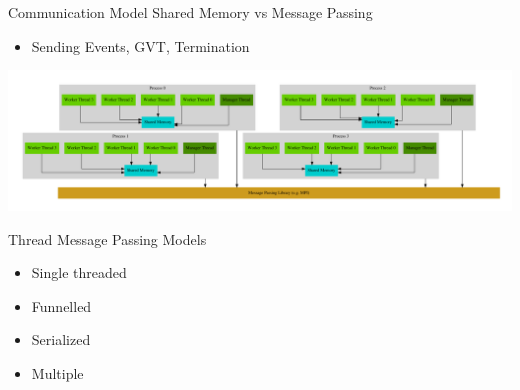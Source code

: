 \documentclass[10pt]{beamer}
\begin{document}
\begin{frame}{Communication Model}
    Shared Memory vs Message Passing
    \begin{itemize}
        \item Sending Events, GVT, Termination
    \end{itemize}
    \centerline{\includegraphics[width=1.2\textwidth]{../figs/graphviz/warped_communication.pdf}}
    Thread Message Passing Models
    \begin{itemize}
        \item Single threaded
        \item Funnelled
        \item Serialized
        \item Multiple
    \end{itemize}
\end{frame}
\end{document}
